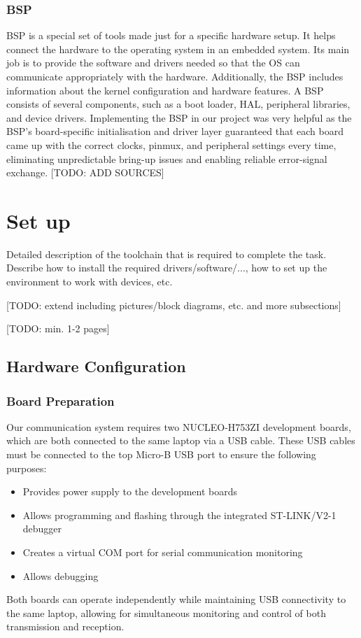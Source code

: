 \documentclass{scrartcl}
\newcommand{\TODO}[1]{{\color{red} [TODO: #1]}}
\begin{document}
\subsubsection{BSP}
\gls{BSP} is a special set of tools made just for a specific hardware setup. It helps connect the hardware to the operating system in an embedded system. Its main job is to provide the software and drivers needed so that the OS can communicate appropriately with the hardware. Additionally, the \gls{BSP} includes information about the kernel configuration and hardware features. A \gls{BSP} consists of several components, such as a boot loader, \gls{HAL}, peripheral libraries, and device drivers. Implementing the \gls{BSP} in our project was very helpful as the \gls{BSP}'s board-specific initialisation and driver layer guaranteed that each board came up with the correct clocks, pinmux, and peripheral settings every time, eliminating unpredictable bring-up issues and enabling reliable error-signal exchange.\TODO{ADD SOURCES}


\newpage

\section{Set up}
Detailed description of the toolchain that is required to complete the task.
Describe how to install the required drivers/software/..., how to set up the environment to work with devices, etc.

\TODO{extend including pictures/block diagrams, etc. and more subsections}

\TODO{min. 1-2 pages}

\subsection{Hardware Configuration}
\subsubsection{Board Preparation}
Our communication system requires two NUCLEO-H753ZI development boards, which are both connected to the same laptop via a USB cable. These USB cables must be connected to the top Micro-B USB port to ensure the following purposes:
\begin{itemize}
\item Provides power supply to the development boards
\item Allows programming and flashing through the integrated ST-LINK/V2-1 debugger
\item Creates a virtual COM port for serial communication monitoring
\item Allows debugging
\end{itemize}
Both boards can operate independently while maintaining USB connectivity to the same laptop, allowing for simultaneous monitoring and control of both transmission and reception.
\end{document}
